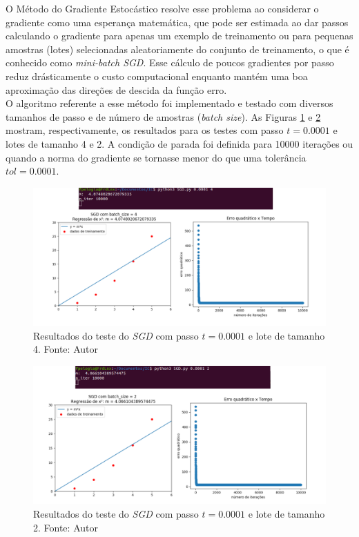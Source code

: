 \documentclass[a4paper,12pt]{article}
\begin{document}
O Método do Gradiente Estocástico resolve esse problema ao considerar o gradiente como uma esperança matemática, que pode ser estimada ao dar passos calculando o gradiente para apenas um exemplo de treinamento ou para pequenas amostras (lotes) selecionadas aleatoriamente do conjunto de treinamento, o que é conhecido como \textit{mini-batch SGD}. Esse cálculo de poucos gradientes por passo reduz drásticamente o custo computacional enquanto mantém uma boa aproximação das direções de descida da função erro.\\

O algoritmo referente a esse método foi implementado e testado com diversos tamanhos de passo e de número de amostras (\textit{batch size}). As Figuras \ref{fig:SGD4} e \ref{fig:SGD2} mostram, respectivamente, os resultados para os testes com passo $t = 0.0001$ e lotes de tamanho 4 e 2. A condição de parada foi definida para 10000 iterações ou quando a norma do gradiente se tornasse menor do que uma tolerância $tol = 0.0001$. 

\begin{figure}[H]
\centering 
\includegraphics[scale=0.5]{Figuras/SGD_4.png}
\caption{Resultados do teste do \textit{SGD} com passo $t = 0.0001$ e lote de tamanho 4. Fonte: Autor}
\label{fig:SGD4}
\end{figure} 

\begin{figure}[H]
\centering 
\includegraphics[scale=0.5]{Figuras/SGD_2.png}
\caption{Resultados do teste do \textit{SGD} com passo $t = 0.0001$ e lote de tamanho 2. Fonte: Autor}
\label{fig:SGD2}
\end{figure} 
\end{document}
